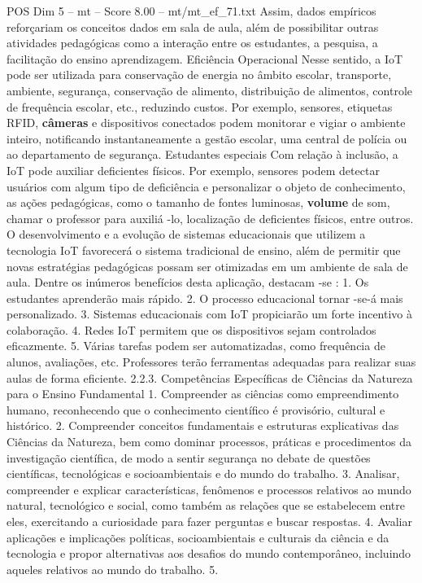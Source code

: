 \begin{textsample}{POS Dim 5 – mt – Score 8.00 – mt/mt\_ef\_71.txt}
Assim, dados empíricos reforçariam os conceitos dados em sala de aula, além de possibilitar outras atividades pedagógicas como a interação entre os estudantes, a pesquisa, a facilitação do ensino aprendizagem.
Eficiência Operacional Nesse sentido, a IoT pode ser utilizada para conservação de energia no âmbito escolar, transporte, ambiente, segurança, conservação de alimento, distribuição de alimentos, controle de frequência escolar, etc., reduzindo custos.
Por exemplo, sensores, etiquetas RFID, \textbf{câmeras} e dispositivos conectados podem monitorar e vigiar o ambiente inteiro, notificando instantaneamente a gestão escolar, uma central de polícia ou ao departamento de segurança.
Estudantes especiais Com relação à inclusão, a IoT pode auxiliar deficientes físicos.
Por exemplo, sensores podem detectar usuários com algum tipo de deficiência e personalizar o objeto de conhecimento, as ações pedagógicas, como o tamanho de fontes luminosas, \textbf{volume} de som, chamar o professor para auxiliá -lo, localização de deficientes físicos, entre outros.
O desenvolvimento e a evolução de sistemas educacionais que utilizem a tecnologia IoT favorecerá o sistema tradicional de ensino, além de permitir que novas estratégias pedagógicas possam ser otimizadas em um ambiente de sala de aula.
Dentre os inúmeros benefícios desta aplicação, destacam -se : 1.
Os estudantes aprenderão mais rápido. 2.
O processo educacional tornar -se-á mais personalizado. 3.
Sistemas educacionais com IoT propiciarão um forte incentivo à colaboração. 4.
Redes IoT permitem que os dispositivos sejam controlados eficazmente. 5.
Várias tarefas podem ser automatizadas, como frequência de alunos, avaliações, etc.
Professores terão ferramentas adequadas para realizar suas aulas de forma eficiente. 2.2.3.
Competências Específicas de Ciências da Natureza para o Ensino Fundamental 1.
Compreender as ciências como empreendimento humano, reconhecendo que o conhecimento científico é provisório, cultural e histórico. 2.
Compreender conceitos fundamentais e estruturas explicativas das Ciências da Natureza, bem como dominar processos, práticas e procedimentos da investigação científica, de modo a sentir segurança no debate de questões científicas, tecnológicas e socioambientais e do mundo do trabalho. 3.
Analisar, compreender e explicar características, fenômenos e processos relativos ao mundo natural, tecnológico e social, como também as relações que se estabelecem entre eles, exercitando a curiosidade para fazer perguntas e buscar respostas. 4.
Avaliar aplicações e implicações políticas, socioambientais e culturais da ciência e da tecnologia e propor alternativas aos desafios do mundo contemporâneo, incluindo aqueles relativos ao mundo do trabalho. 5.

\end{textsample}
